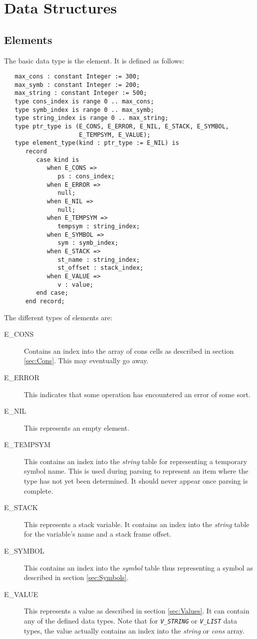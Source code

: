 \documentclass[10pt, openany]{book}
\newcommand{\constant}[1]{\emph{\texttt{#1}}}
\begin{document}
\section{Data Structures}

\subsection{Elements}
The basic data type is the element.  It is defined as follows:
\lstset{language=Ada}
\begin{lstlisting}
   max_cons : constant Integer := 300;
   max_symb : constant Integer := 200;
   max_string : constant Integer := 500;
   type cons_index is range 0 .. max_cons;
   type symb_index is range 0 .. max_symb;
   type string_index is range 0 .. max_string;
   type ptr_type is (E_CONS, E_ERROR, E_NIL, E_STACK, E_SYMBOL,
                     E_TEMPSYM, E_VALUE);
   type element_type(kind : ptr_type := E_NIL) is
      record
         case kind is
            when E_CONS =>
               ps : cons_index;
            when E_ERROR =>
               null;
            when E_NIL =>
               null;
            when E_TEMPSYM =>
               tempsym : string_index;
            when E_SYMBOL =>
               sym : symb_index;
            when E_STACK =>
               st_name : string_index;
               st_offset : stack_index;
            when E_VALUE =>
               v : value;
         end case;
      end record;
\end{lstlisting}

The different types of elements are:
\begin{description}
  \item[E\_CONS] Contains an index into the array of cons cells as described in section \ref{sec:Cons}.  This may eventually go away.
  \item[E\_ERROR]  This indicates that some operation has encountered an error of some sort.
  \item[E\_NIL] This represents an empty element.
  \item[E\_TEMPSYM] This contains an index into the \emph{string} table for representing a temporary symbol name.  This is used during parsing to represent an item where the type has not yet been determined.  It should never appear once parsing is complete.
  \item[E\_STACK] This represents a stack variable.  It contains an index into the \emph{string} table for the variable's name and a stack frame offset.
  \item[E\_SYMBOL] This contains an index into the \emph{symbol} table thus representing a symbol as described in section \ref{sec:Symbols}.
  \item[E\_VALUE] This represents a value as described in section \ref{sec:Values}.  It can contain any of the defined data types.  Note that for \constant{V\_STRING} or \constant{V\_LIST} data types, the value actually contains an index into the \emph{string} or \emph{cons} array.
\end{description}
\end{document}
